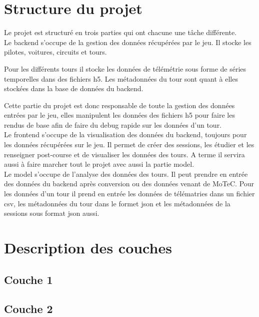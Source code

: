 \documentclass[a4paper,12pt]{report}
\begin{document}
\section{Structure du projet}

Le projet est structuré en trois parties qui ont chacune une tâche différente.\\ 

Le backend s'occupe de la gestion des données récupérées par le jeu. Il stocke les pilotes, voitures, circuits et tours.

Pour les différents tours il stocke les données de télémétrie sous forme de séries temporelles dans des fichiers h5. Les métadonnées du tour sont quant à elles stockées dans la base de données du backend.

Cette partie du projet est donc responsable de toute la gestion des données entrées par le jeu, elles manipulent les données des fichiers h5 pour faire les rendus de base afin de faire du debug rapide sur les données d'un tour.\\

Le frontend s'occupe de la visualisation des données du backend, toujours pour les données récupérées sur le jeu. Il permet de créer des sessions, les étudier et les renseigner post-course et de visualiser les données des tours. A terme il servira aussi à faire marcher tout le projet avec aussi la partie model.\\

Le model s'occupe de l'analyse des données des tours. Il peut prendre en entrée des données du backend après conversion ou des données venant de MoTeC. Pour les données d'un tour il prend en entrée les données de télématries dans un fichier csv, les métadonnées du tour dans le formet json et les métadonnées de la sessions sous format json aussi.\\


\section{Description des couches}

\subsection{Couche 1}

\subsection{Couche 2}
\end{document}
